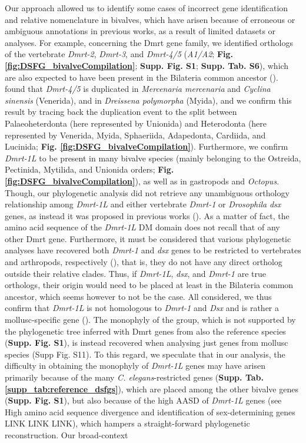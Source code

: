 \documentclass[../main.tex]{subfiles}
\begin{document}
Our approach allowed us to identify some cases of incorrect gene identification and relative nomenclature in bivalves, which have arisen because of erroneous or ambiguous annotations in previous works, as a result of limited datasets or analyses. For example, concerning the Dmrt gene family, we identified orthologs of the vertebrate \textit{Dmrt-2}, \textit{Dmrt-3}, and \textit{Dmrt-4/5} (\textit{A1/A2}; \textbf{Fig. \ref{fig:DSFG_bivalveCompilation}}; \textbf{Supp. Fig. S1}; \textbf{Supp. Tab. S6}), which are also expected to have been present in the Bilateria common ancestor (\textbf{\cite{mawaribuchi2019independent}}). \textbf{\cite{wang2023genome}} found that \textit{Dmrt-4/5} is duplicated in \textit{Mercenaria mercenaria} and \textit{Cyclina sinensis} (Venerida), and in \textit{Dreissena polymorpha} (Myida), and we confirm this result by tracing back the duplication event to the split between Palaeoheterdonta (here represented by Unionida) and Heterodonta (here represented by Venerida, Myida, Sphaeriida, Adapedonta, Cardiida, and Lucinida; \textbf{Fig. \ref{fig:DSFG_bivalveCompilation}}). Furthermore, we confirm \textit{Dmrt-1L} to be present in many bivalve species (mainly belonging to the Ostreida, Pectinida, Mytilida, and Unionida orders; \textbf{Fig. \ref{fig:DSFG_bivalveCompilation}}), as well as in gastropods and \textit{Octopus}. Though, our phylogenetic analysis did not retrieve any unambiguous orthology relationship among \textit{Dmrt-1L} and either vertebrate \textit{Dmrt-1} or \textit{Drosophila} \textit{dsx} genes, as instead it was proposed in previous works (\textbf{\cite{li2018foxl2,evensen2022comparative}}). As a matter of fact, the amino acid sequence of the \textit{Dmrt-1L} DM domain does not recall that of any other Dmrt gene. Furthermore, it must be considered that various phylogenetic analyses have recovered both \textit{Dmrt-1} and \textit{dsx} genes to be restricted to vertebrates and arthropods, respectively (\textbf{\cite{wexler2014pan,mawaribuchi2019independent,panara2019phylogenetic}}), that is, they do not have any direct ortholog outside their relative clades. Thus, if \textit{Dmrt-1L}, \textit{dsx}, and \textit{Dmrt-1} are true orthologs, their origin would need to be placed at least in the Bilateria common ancestor, which seems however to not be the case. All considered, we thus confirm that \textit{Dmrt-1L} is not homologous to \textit{Dmrt-1} and \textit{Dsx} and is rather a mollusc-specific gene (\textbf{\cite{evensen2022comparative}}). The monophyly of the group, which is not supported by the phylogenetic tree inferred with Dmrt genes from also the reference species (\textbf{Supp. Fig. S1}), is instead recovered when analysing just genes from mollusc species (Supp Fig. S11). To this regard, we speculate that in our analysis, the difficulty in obtaining the monophyly of \textit{Dmrt-1L} genes may have arisen primarily because of the many \textit{C. elegans}-restricted genes (\textbf{Supp. Tab. \ref{supp_tab:reference_dsfgs}}), which are placed among the other bivalve genes (\textbf{Supp. Fig. S1}), but also because of the high AASD of \textit{Dmrt-1L} genes (see High amino acid sequence divergence and identification of sex-determining genes LINK LINK LINK), which hampers a straight-forward phylogenetic reconstruction. Our broad-context 
\end{document}
